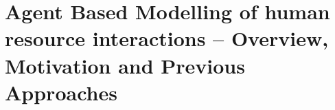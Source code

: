 \section{Agent Based Modelling of human resource interactions -- Overview, Motivation and Previous Approaches}

